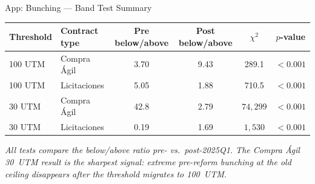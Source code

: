 \documentclass[9pt,aspectratio=169]{beamer}
\begin{document}
\begin{frame}{App: Bunching --- Band Test Summary}
\small
\begin{center}
\begin{tabular}{llcccc}
\toprule
Threshold & Contract type & Pre below/above & Post below/above
          & $\chi^2$ & $p$-value \\
\midrule
100 UTM & Compra Ágil  & 3.70 & 9.43  & 289.1       & $<0.001$ \\
100 UTM & Licitaciones & 5.05 & 1.88  & 710.5       & $<0.001$ \\
30 UTM  & Compra Ágil  & 42.8 & 2.79  & $74{,}299$  & $<0.001$ \\
30 UTM  & Licitaciones & 0.19 & 1.69  & $1{,}530$   & $<0.001$ \\
\bottomrule
\end{tabular}
\end{center}
\medskip
\small\textit{All tests compare the below/above ratio pre- vs.\
post-2025Q1.  The Compra Ágil 30~UTM result is the sharpest signal:
extreme pre-reform bunching at the old ceiling disappears after the
threshold migrates to 100~UTM.}
\end{frame}
\end{document}
